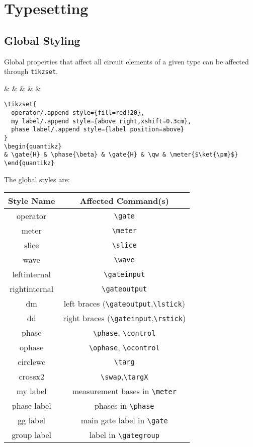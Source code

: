\documentclass[aps,pra,10pt,nofootinbib]{revtex4}
\begin{document}
\section{Typesetting}

\subsection{Global Styling}

Global properties that affect all circuit elements of a given type can be affected through \verb!tikzset!.
\begin{Code}
\begin{center}
\begin{quantikz}
&  & \phase{\beta} &  & \qw & \meter{$\ket{\pm}$}
\end{quantikz}
\end{center}
\tcblower
\begin{lstlisting}
\tikzset{
  operator/.append style={fill=red!20},
  my label/.append style={above right,xshift=0.3cm},
  phase label/.append style={label position=above}
}
\begin{quantikz}
& \gate{H} & \phase{\beta} & \gate{H} & \qw & \meter{$\ket{\pm}$}
\end{quantikz}
\end{lstlisting}
\end{Code}
The global styles are:
\begin{center}
\begin{tabular}{c|c}
Style Name & Affected Command(s)	\\
\hline
operator & \verb!\gate!	\\
meter & \verb!\meter! \\
slice & \verb!\slice! \\
wave & \verb!\wave! \\
leftinternal	& \verb!\gateinput! \\
rightinternal	& \verb!\gateoutput! \\
dm & left braces (\verb!\gateoutput!,\verb!\lstick!) \\
dd & right braces (\verb!\gateinput!,\verb!\rstick!) \\
phase & \verb!\phase!, \verb!\control! \\
ophase & \verb!\ophase!, \verb!\ocontrol! \\
circlewc & \verb!\targ! \\
crossx2 & \verb!\swap!,\verb!\targX! \\
my label & measurement bases in \verb!\meter! \\
phase label & phases in \verb!\phase! \\
gg label & main gate label in \verb!\gate! \\
group label & label in \verb!\gategroup!
\end{tabular}
\end{center}
\end{document}
